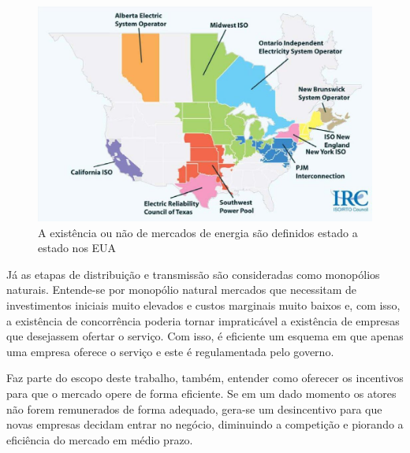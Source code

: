 \begin{figure}
\begin{centering}
\includegraphics[scale=0.4]{anexos/mercados-eua.png}
\par\end{centering}

\caption{\label{fig:mercado-eua}A existência ou não de mercados de energia são definidos estado a estado nos EUA}
\end{figure}


Já as etapas de distribuição e transmissão são consideradas como monopólios
naturais. Entende-se por monopólio natural mercados que necessitam de
investimentos iniciais muito elevados e custos marginais muito baixos
e, com isso, a existência de concorrência poderia tornar impraticável
a existência de empresas que desejassem ofertar o serviço. Com isso,
é eficiente um esquema em que apenas uma empresa oferece o serviço
e este é regulamentada pelo governo. 

Faz parte do escopo deste trabalho, também, entender como oferecer os incentivos para que o mercado opere de forma eficiente. Se em um dado momento os atores não forem remunerados de forma adequado, gera-se um desincentivo para que novas empresas decidam entrar no negócio, diminuindo a competição e piorando a eficiência do mercado em médio prazo. 





